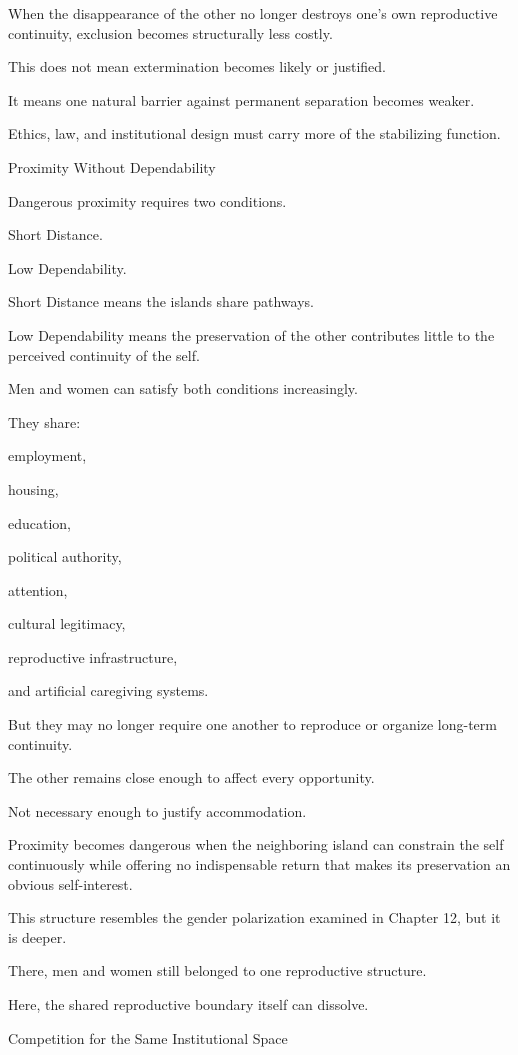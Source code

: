 When the disappearance of the other no longer destroys one’s own reproductive continuity, exclusion becomes structurally less costly.

This does not mean extermination becomes likely or justified.

It means one natural barrier against permanent separation becomes weaker.

Ethics, law, and institutional design must carry more of the stabilizing function.

Proximity Without Dependability

Dangerous proximity requires two conditions.

Short Distance.

Low Dependability.

Short Distance means the islands share pathways.

Low Dependability means the preservation of the other contributes little to the perceived continuity of the self.

Men and women can satisfy both conditions increasingly.

They share:

employment,

housing,

education,

political authority,

attention,

cultural legitimacy,

reproductive infrastructure,

and artificial caregiving systems.

But they may no longer require one another to reproduce or organize long-term continuity.

The other remains close enough to affect every opportunity.

Not necessary enough to justify accommodation.

Proximity becomes dangerous when the neighboring island can constrain the self continuously while offering no indispensable return that makes its preservation an obvious self-interest.

This structure resembles the gender polarization examined in Chapter 12, but it is deeper.

There, men and women still belonged to one reproductive structure.

Here, the shared reproductive boundary itself can dissolve.

Competition for the Same Institutional Space

